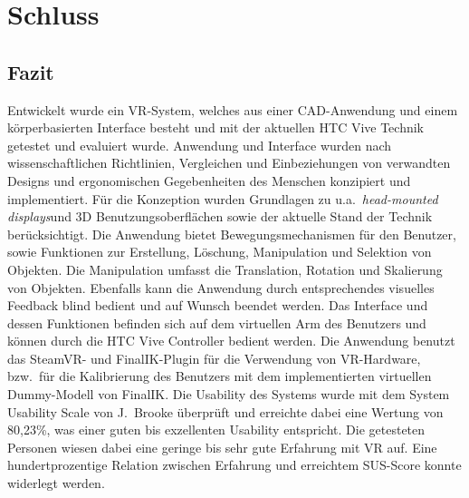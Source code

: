 \section{Schluss}

\subsection{Fazit}
Entwickelt wurde ein VR-System, welches aus einer CAD-Anwendung und einem körperbasierten Interface besteht und mit der aktuellen HTC Vive Technik getestet und evaluiert wurde. Anwendung und Interface wurden nach wissenschaftlichen Richtlinien, Vergleichen und Einbeziehungen von verwandten Designs und ergonomischen Gegebenheiten des Menschen konzipiert und implementiert. Für die Konzeption wurden Grundlagen zu u.a.~\textit{head-mounted displays}und 3D Benutzungsoberflächen sowie der aktuelle Stand der Technik berücksichtigt. Die Anwendung bietet Bewegungsmechanismen für den Benutzer, sowie Funktionen zur Erstellung, Löschung, Manipulation und Selektion von Objekten. Die Manipulation umfasst die Translation, Rotation und Skalierung von Objekten. Ebenfalls kann die Anwendung durch entsprechendes visuelles Feedback blind bedient und auf Wunsch beendet werden. Das Interface und dessen Funktionen befinden sich auf dem virtuellen Arm des Benutzers und können durch die HTC Vive Controller bedient werden. Die Anwendung benutzt das SteamVR- und FinalIK-Plugin für die Verwendung von VR-Hardware, bzw.~für die Kalibrierung des Benutzers mit dem implementierten virtuellen Dummy-Modell von FinalIK. Die Usability des Systems wurde mit dem System Usability Scale von J.~Brooke überprüft und erreichte dabei eine Wertung von 80,23\%, was einer guten bis exzellenten Usability entspricht. Die getesteten Personen wiesen dabei eine geringe bis sehr gute Erfahrung mit VR auf. Eine hundertprozentige Relation zwischen Erfahrung und erreichtem SUS-Score konnte widerlegt werden.

